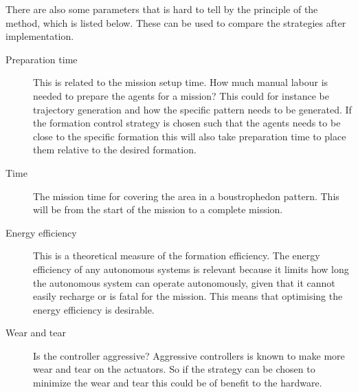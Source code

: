 There are also some parameters that is hard to tell by the principle
of the method, which is listed below. These can be used to compare the
strategies after implementation.
\begin{description}
\item[Preparation time] This is related to the mission setup time. How
	much manual labour is needed to prepare the agents for a mission?
	This could for instance be trajectory generation and how the
	specific pattern needs to be generated. If the formation control strategy is chosen such that the agents needs to be close to the specific formation this will also take preparation time to place them relative to the desired formation.
\item[Time] The mission time for covering the area in a boustrophedon
	pattern. This will be from the start of the mission to a complete mission.
\item[Energy efficiency] This is a theoretical measure of the
	formation efficiency. The energy efficiency of any autonomous systems is relevant because it limits how long the autonomous system can operate autonomously, given that it cannot easily recharge or is fatal for the mission. This means that optimising the energy efficiency is desirable.
\item[Wear and tear] Is the controller aggressive? Aggressive
	controllers is known to make more wear and tear on the actuators. So
	if the strategy can be chosen to minimize the wear and tear this
	could be of benefit to the hardware.
\end{description}




